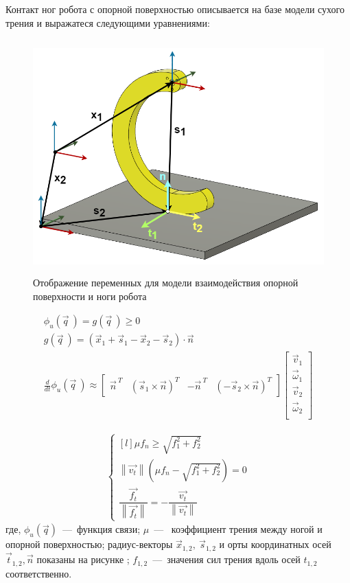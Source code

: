 Контакт ног робота с опорной поверхностью  описывается на базе модели сухого трения и выражатеся следующими уравнениями:

\begin{figure}[H]
    \centering\includegraphics[height=9cm,width=1\textwidth,keepaspectratio]{images/contact_interaction.png}
    \caption{Отображение переменных для модели взаимодействия опорной поверхности и ноги робота}
    \label{fig:contact_interaction.png}
\end{figure}

\begin{align}
    \label{eq:contact_inter}
    \phi_u(\vec{q}\ ) = g(\vec{q}\ ) \geqslant 0 \\ 
    g(\vec{q}\ ) = (\vec{x}_1 + \vec{s}_1 - \vec{x}_2 - \vec{s}_2) \cdot \vec{n} \\
    \frac{d }{d t}\phi_u(\vec{q}\ ) \approx \begin{bmatrix}
        \vec{n}^{\ T} & (\vec{s}_1 \times \vec{n})^T & -\vec{n}^{\ T} & (-\vec{s}_2 \times \vec{n})^T
    \end{bmatrix} \begin{bmatrix}
        \vec{v}_1\\ 
    \vec{\omega}_1\\ 
    \vec{v}_2\\
    \vec{\omega}_2\\
    \end{bmatrix}
\end{align} 

\begin{align}
    \label{eq:ground_inter}
\left\{\begin{matrix*}[l]
\mu f_n \geqslant \sqrt{f_1^2 + f_2^2}\\ 
\left\lVert \vec{v_t}\right\rVert (\mu f_n - \sqrt{f_1^2 + f_2^2}) = 0\\
\dfrac{\vec{f_t}}{\left\lVert \vec{f_t}\right\rVert } = - \dfrac{\vec{v_t}}{\left\lVert \vec{v_t}\right\rVert }
\end{matrix*}\right.
\end{align}
где, $\phi_u(\vec{q})$~---~функция связи; $ \mu $~---~ коэффициент трения между ногой и опорной поверхностью;  радиус-векторы $\vec{x}_{1,2},\ \vec{s}_{1,2}$ и орты координатных осей $\vec{t}_{1,2}, \vec{n}$ показаны на рисунке ; $ f_{1,2} $~---~значения сил трения вдоль осей $t_{1,2}$ соответственно.

